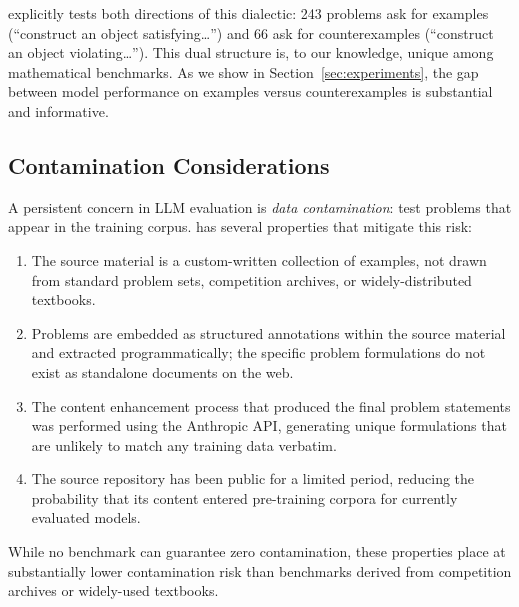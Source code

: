 \ecagbench{} explicitly tests both directions of this dialectic: 243 problems ask for examples (``construct an object satisfying\ldots'') and 66 ask for counterexamples (``construct an object violating\ldots'').
This dual structure is, to our knowledge, unique among mathematical benchmarks.
As we show in Section~\ref{sec:experiments}, the gap between model performance on examples versus counterexamples is substantial and informative.

\subsection{Contamination Considerations}

A persistent concern in LLM evaluation is \emph{data contamination}: test problems that appear in the training corpus.
\ecagbench{} has several properties that mitigate this risk:
\begin{enumerate}[nosep]
  \item The source material is a custom-written collection of examples, not drawn from standard problem sets, competition archives, or widely-distributed textbooks.
  \item Problems are embedded as structured annotations within the source material and extracted programmatically; the specific problem formulations do not exist as standalone documents on the web.
  \item The content enhancement process that produced the final problem statements was performed using the Anthropic API, generating unique formulations that are unlikely to match any training data verbatim.
  \item The source repository has been public for a limited period, reducing the probability that its content entered pre-training corpora for currently evaluated models.
\end{enumerate}
While no benchmark can guarantee zero contamination, these properties place \ecagbench{} at substantially lower contamination risk than benchmarks derived from competition archives or widely-used textbooks.
